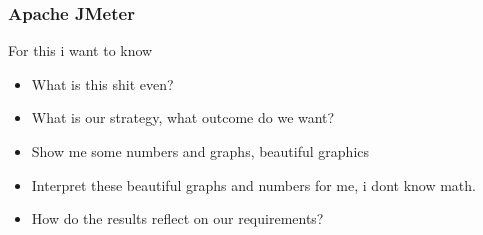 \subsubsection{Apache JMeter}
For this i want to know
\begin{itemize}
    \item What is this shit even?
    \item What is our strategy, what outcome do we want?
    \item Show me some numbers and graphs, beautiful graphics 
    \item Interpret these beautiful graphs and numbers for me, i dont know math.
    \item How do the results reflect on our requirements?
\end{itemize}